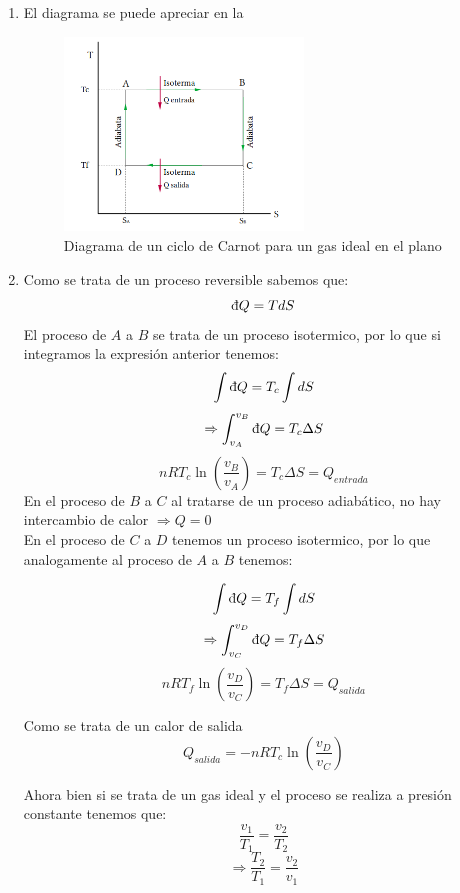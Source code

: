 \begin{enumerate}[label=\textbf{\alph*)}]
      \item{
                  El diagrama se puede apreciar en la  
                  \begin{figure}[H]
                        \centering
                        \includegraphics[width=0.60\textwidth]{T-S.png}
                        \caption{Diagrama de un ciclo de Carnot para un gas ideal 
                        en el plano }
                        \label{fig:ccst}
                  \end{figure}
            }

      \item  Como se trata de un proceso reversible  sabemos que:
            \[ \dbar Q =TdS \]
            El proceso de $A$ a $B$ se trata de un proceso isotermico, por lo que si integramos la expresión anterior tenemos:
            \[ \int \dbar Q =T_{c}\int dS \]
            \[ \Rightarrow \int _{v_A} ^{v_B} \dbar Q = T_{c} \Delta S\]
            \[nRT_c \ln \left( \frac{v_B}{v_A}\right) = T_{c}\Delta S = Q_{entrada}\]
            En el proceso de $B$ a $C$ al tratarse de un proceso adiabático, no hay intercambio de calor $\Rightarrow Q=0$\\

            En  el proceso de $C$ a $D$ tenemos un proceso isotermico, por lo que analogamente al proceso de $A$ a $B$ tenemos:

            \[ \int \dbar Q =T_{f}\int dS \]
            \[ \Rightarrow \int _{v_C} ^{v_D} \dbar Q = T_{f} \Delta S\]
            \[nRT_f \ln \left( \frac{v_D}{v_C}\right) = T_{f}\Delta S = Q_{salida}\]

            Como se trata de un calor de salida
            \[Q_{salida}=-nRT_c \ln \left( \frac{v_D}{v_C}\right)\]


            Ahora bien si  se trata de un gas ideal y el proceso se realiza a presión constante tenemos que:
            \[ \frac{v_1}{T_1}=\frac{v_2}{T_2}\]
            \[\Rightarrow \frac{T_2}{T_1}=\frac{v_2}{v_1}\]


\end{enumerate}
